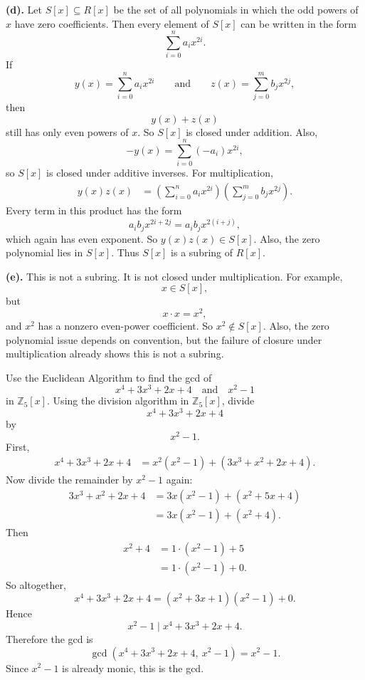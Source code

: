 \begin{problem}
    \textbf{(d).}
    Let $S[x]\subseteq R[x]$ be the set of all polynomials in which the odd powers of $x$ have zero coefficients.
    Then every element of $S[x]$ can be written in the form
    \[
        \sum_{i=0}^n a_i x^{2i}.
    \]
    If
    \[
        y(x)=\sum_{i=0}^n a_i x^{2i}
        \qquad\text{and}\qquad
        z(x)=\sum_{j=0}^m b_j x^{2j},
    \]
    then
    \[
        y(x)+z(x)
    \]
    still has only even powers of $x$.
    So $S[x]$ is closed under addition.
    Also,
    \[
        -y(x)=\sum_{i=0}^n (-a_i)x^{2i},
    \]
    so $S[x]$ is closed under additive inverses.
    For multiplication,
    \begin{align*}
        y(x)z(x)
        &=
        \left(\sum_{i=0}^n a_i x^{2i}\right)\left(\sum_{j=0}^m b_j x^{2j}\right).
    \end{align*}
    Every term in this product has the form
    \[
        a_i b_j x^{2i+2j}=a_i b_j x^{2(i+j)},
    \]
    which again has even exponent.
    So $y(x)z(x)\in S[x]$.
    Also, the zero polynomial lies in $S[x]$.
    Thus $S[x]$ is a subring of $R[x]$.

    \textbf{(e).}
    This is not a subring.
    It is not closed under multiplication.
    For example,
    \[
        x\in S[x],
    \]
    but
    \[
        x\cdot x=x^2,
    \]
    and $x^2$ has a nonzero even-power coefficient.
    So $x^2\notin S[x]$.
    Also, the zero polynomial issue depends on convention, but the failure of closure under multiplication already shows this is not a subring.
\end{problem}


\begin{problem}{
    Use the Euclidean Algorithm to find the gcd of
    \[
        x^4+3x^3+2x+4
        \quad\text{and}\quad
        x^2-1
    \]
    in $\mathbb{Z}_5[x]$.
}
    Using the division algorithm in $\mathbb{Z}_5[x]$, divide
    \[
        x^4+3x^3+2x+4
    \]
    by
    \[
        x^2-1.
    \]
    First,
    \begin{align*}
        x^4+3x^3+2x+4
        &=
        x^2(x^2-1)+(3x^3+x^2+2x+4).
    \end{align*}
    Now divide the remainder by $x^2-1$ again:
    \begin{align*}
        3x^3+x^2+2x+4
        &=
        3x(x^2-1)+(x^2+5x+4)\\
        &=
        3x(x^2-1)+(x^2+4).
    \end{align*}
    Then
    \begin{align*}
        x^2+4
        &=
        1\cdot (x^2-1)+5\\
        &=
        1\cdot (x^2-1)+0.
    \end{align*}
    So altogether,
    \[
        x^4+3x^3+2x+4=(x^2+3x+1)(x^2-1)+0.
    \]
    Hence
    \[
        x^2-1\mid x^4+3x^3+2x+4.
    \]
    Therefore the gcd is
    \[
        \gcd(x^4+3x^3+2x+4,\ x^2-1)=x^2-1.
    \]
    Since $x^2-1$ is already monic, this is the gcd.
\end{problem}

